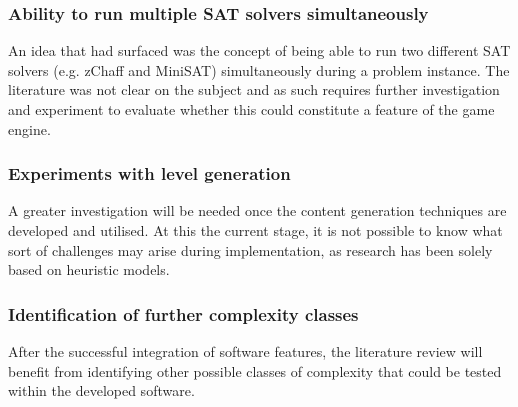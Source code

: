 \documentclass[11pt, a4paper, oneside]{report} %
\begin{document}
\subsubsection{Ability to run multiple SAT solvers simultaneously}

An idea that had surfaced was the concept of being able to run two different SAT
solvers (e.g. zChaff and MiniSAT) simultaneously during a problem instance. The
literature was not clear on the subject and as such requires further
investigation and experiment to evaluate whether this could constitute a feature
of the game engine.

\subsubsection{Experiments with level generation}

A greater investigation will be needed once the content generation techniques
are developed and utilised. At this the current stage, it is not possible to
know what sort of challenges may arise during implementation, as research has
been solely based on heuristic models.

\subsubsection{Identification of further complexity classes}

After the successful integration of software features, the literature review
will benefit from identifying other possible classes of complexity that could be
tested within the developed software.





\end{document}
